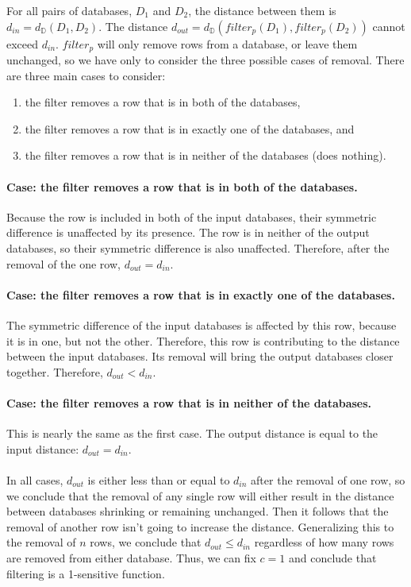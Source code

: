 \documentclass[12pt]{report}
\begin{document}
For all pairs of databases, $D_1$ and $D_2$, the distance between them is $d_{in} = d_{\mathbb D}(D_1,D_2)$.
The distance $d_{out} = d_{\mathbb D}(filter_p(D_1),filter_p(D_2))$ cannot exceed $d_{in}$.
$filter_p$ will only remove rows from a database, or leave them unchanged, so we have only to consider the three possible cases of removal.
There are three main cases to consider:
\begin{enumerate}
  \item the filter removes a row that is in both of the databases,
  \item the filter removes a row that is in exactly one of the databases, and
  \item the filter removes a row that is in neither of the databases (does nothing).
\end{enumerate}

\paragraph{Case: the filter removes a row that is in both of the databases.}
Because the row is included in both of the input databases, their symmetric difference is unaffected by its presence.
The row is in neither of the output databases, so their symmetric difference is also unaffected.
Therefore, after the removal of the one row, $d_{out} = d_{in}$.

\paragraph{Case: the filter removes a row that is in exactly one of the databases.}
The symmetric difference of the input databases is affected by this row, because it is in one, but not the other.
Therefore, this row is contributing to the distance between the input databases.
Its removal will bring the output databases closer together.
Therefore, $d_{out} < d_{in}$.

\paragraph{Case: the filter removes a row that is in neither of the databases.}
This is nearly the same as the first case.
The output distance is equal to the input distance: $d_{out} = d_{in}$.

\paragraph{} %
In all cases, $d_{out}$ is either less than or equal to $d_{in}$ after the removal of one row, so we conclude that the removal of any single row will either result in the distance between databases shrinking or remaining unchanged.
Then it follows that the removal of another row isn't going to increase the distance.
Generalizing this to the removal of $n$ rows, we conclude that $d_{out} \le d_{in}$ regardless of how many rows are removed from either database.
Thus, we can fix $c=1$ and conclude that filtering is a 1-sensitive function.
\end{document}
